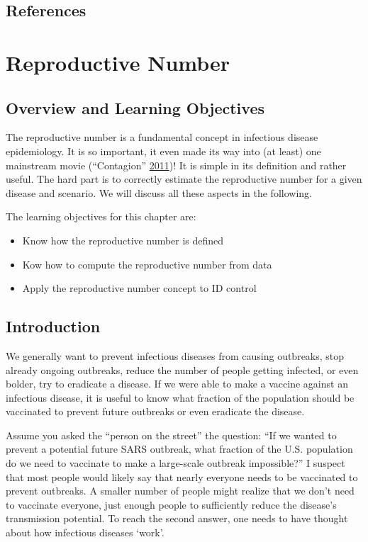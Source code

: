 \documentclass[
]{book}
\providecommand{\tightlist}{%
  \setlength{\itemsep}{0pt}\setlength{\parskip}{0pt}}
\begin{document}
\hypertarget{references-3}{%
\section{References}\label{references-3}}

\hypertarget{R0}{%
\chapter{Reproductive Number}\label{R0}}

\hypertarget{overview-and-learning-objectives-3}{%
\section{Overview and Learning Objectives}\label{overview-and-learning-objectives-3}}

The reproductive number is a fundamental concept in infectious disease epidemiology. It is so important, it even made its way into (at least) one mainstream movie (``Contagion'' \protect\hyperlink{ref-contagionmovie}{2011})! It is simple in its definition and rather useful. The hard part is to correctly estimate the reproductive number for a given disease and scenario.
We will discuss all these aspects in the following.

The learning objectives for this chapter are:

\begin{itemize}
\tightlist
\item
  Know how the reproductive number is defined
\item
  Kow how to compute the reproductive number from data
\item
  Apply the reproductive number concept to ID control
\end{itemize}

\hypertarget{introduction-3}{%
\section{Introduction}\label{introduction-3}}

We generally want to prevent infectious diseases from causing outbreaks, stop already ongoing outbreaks, reduce the number of people getting infected, or even bolder, try to eradicate a disease.
If we were able to make a vaccine against an infectious disease, it is useful to know what fraction of the population should be vaccinated to prevent future outbreaks or even eradicate the disease.

Assume you asked the ``person on the street'' the question: ``If we wanted to prevent a potential future SARS outbreak, what fraction of the U.S. population do we need to vaccinate to make a large-scale outbreak impossible?''
I suspect that most people would likely say that nearly everyone needs to be vaccinated to prevent outbreaks. A smaller number of people might realize that we don't need to vaccinate everyone, just enough people to sufficiently reduce the disease's transmission potential. To reach the second answer, one needs to have thought about how infectious diseases `work'.
\end{document}
